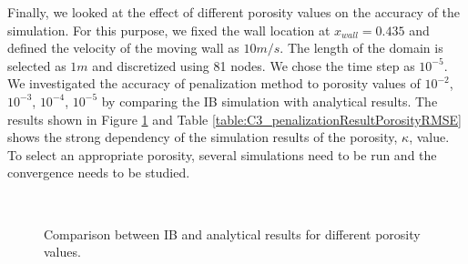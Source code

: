 Finally, we looked at the effect of different porosity values on the accuracy of the simulation. For this purpose, we fixed the wall location at $x_{wall} = 0.435$ and defined the velocity of the moving wall as $10 m/s$. The length of the domain is selected as $1 m$ and discretized using 81 nodes. We chose the time step as $10^{-5}$. We investigated the accuracy of penalization method to porosity values of $10^{-2}$, $10^{-3}$, $10^{-4}$, $10^{-5}$ by comparing the IB simulation with analytical results. The results shown in Figure \ref{fig:C3_penalizationResultPorosity} and Table \ref{table:C3_penalizationResultPorosityRMSE} shows the strong dependency of the simulation results of the porosity, $\kappa$, value. To select an appropriate porosity, several simulations need to be run and the convergence needs to be studied.

\begin{figure}[H]
	\centering
	\quad
	\\
	\quad
	\caption{Comparison between IB and analytical results for different porosity values.}
	\label{fig:C3_penalizationResultPorosity}
\end{figure}

